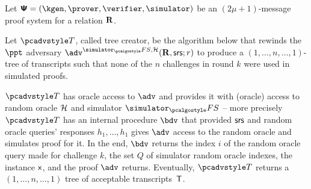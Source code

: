 \documentclass[runningheads,10pt]{llncs}
\begin{document}
\begin{definition}
  Let $\proofsystem = (\kgen, \prover, \verifier, \simulator)$ be an
  $(2 \mu + 1)$-message proof system for a relation $\mathbf{R}$.

  Let $\tdv$, called tree creator, be the
  algorithm below that rewinds the $\ppt$ adversary $\advse^{\simulator_\fs,
          \ro} (\REL, \srs; r)$ to produce a $(1,\dots, n,\dots, 1)$-tree of
  transcripts such that none of the $n$ challenges in round $k$ were used in
  simulated proofs.

  $\tdv$ has oracle access to $\adv$ and provides it with (oracle) access to
  random oracle $\mathcal{H}$ and simulator $\simulator_\fs$ -- more precisely $\tdv$
  has an internal procedure $\bdv$ that provided $\mathsf{srs}$ and random oracle
  queries' responses $h_1, \ldots, h_1$ gives $\adv$ access to the random oracle
  and simulates proof for it. In the end, $\bdv$ returns the index $i$ of the
  random oracle query made for challenge $k$, the set $Q$ of simulator random
  oracle indexes, the instance $\mathsf{x}$, and the proof $\adv$ returns. Eventually,
  $\tdv$ returns a $(1, \ldots, n, \dots, 1)$ tree of acceptable
  transcripts~$\mathsf{T}$.



\end{definition}
\end{document}
